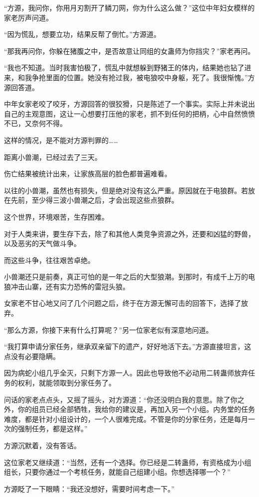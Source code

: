 \begin{this_body}
“方源，我问你，你用月刃割开了鳞刀网，你为什么这么做？”这位中年妇女模样的家老厉声问道。

“因为慌乱，想要立功，结果反帮了倒忙。”方源道。

“那我再问你，你躲在猪腹之中，是否故意让同组的女蛊师为你挡灾？”家老再问。

“我也不知道。当时我害怕极了，慌乱中就想躲到野猪王的体内，结果她也钻了进来，和我争抢里面的位置。她没有抢过我，被电狼咬中身躯，死了。我很惭愧。”方源回答道。

中年女家老咬了咬牙，方源回答的很狡猾，只是陈述了一个事实。实际上并未说出自己的主观意图，这让一心想要打压他的家老，抓不到任何的把柄，心中自然愤愤不已，又奈何不得。

这样的情况，是不能对方源判罪的……

距离小兽潮，已经过去了三天。

伤亡结果被统计出来，让家族高层的脸色都普遍难看。

以往的小兽潮，虽然也有损失，但是绝对没有这么严重。原因就在于电狼群。若放在先前，至少得三波小兽潮之后，才会出现这些点狼群。

这个世界，环境艰苦，生存困难。

对于人类来讲，要生存下去，除了和其他人类竞争资源之外，还要和凶猛的野兽，以及恶劣的天气做斗争。

而这些斗争，往往艰苦卓绝。

小兽潮还只是前奏，真正可怕的是一年之后的大型狼潮。到那时，有成千上万的电狼冲击山寨，还有实力恐怖的雷冠头狼。

女家老不甘心地又问了几个问题之后，终于在方源无懈可击的回答下，选择了放弃。

“那么方源，你接下来有什么打算呢？”另一位家老似有深意地问道。

“我打算申请分家任务，继承双亲留下的遗产，好好地活下去。”方源直接坦言，这点没有必要隐瞒。

因为病蛇小组几乎全灭，只剩下方源一人。因此也导致他不必动用二转蛊师放弃任务的权利，就能领取到分家任务了。

问话的家老点点头，又摇了摇头，对方源道：“你还没明白我的意思。除了你之外，你的组员已经全部牺牲，我给你的建议是，再加入另一个小组。内务堂的任务难度，都是针对小组设计的，一个人很难完成。不管是你的分家任务，还是每月一次的强制任务，都是这样。”

方源沉默着，没有答话。

这位家老又继续道：“当然，还有一个选择。你已经是二转蛊师，有资格成为小组组长，只要你通过一个考核任务，就能自己组建小组。你想选择哪一个？”

方源眨了一下眼睛：“我还没想好，需要时间考虑一下。”


\end{this_body}
